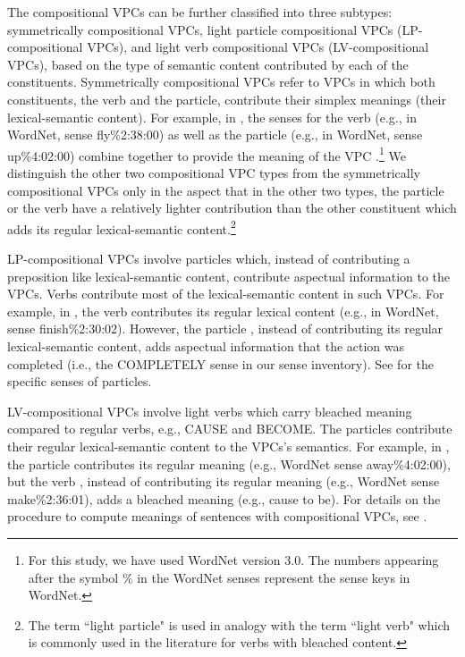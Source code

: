\documentclass[output=paper
,modfonts
,nonflat]{langsci/langscibook}
\begin{document}
The compositional VPCs can be further classified into three subtypes: symmetrically compositional VPCs, light particle compositional VPCs (LP-compositional VPCs), and light verb compositional VPCs (LV-compositional VPCs), based on the type of semantic content contributed by each of the constituents. Symmetrically compositional VPCs refer to VPCs in which both constituents, the verb and the particle, contribute their simplex meanings (their lexical-semantic content). For example, in , the senses for the verb  (e.g., in WordNet, sense fly\%2:38:00) as well as the particle  (e.g., in WordNet, sense up\%4:02:00) combine together to provide the meaning of the VPC .\footnote{For this study, we have used WordNet version 3.0. The numbers appearing after the symbol \% in the WordNet senses represent the sense keys in WordNet.} We distinguish the other two compositional VPC types from the symmetrically compositional VPCs only in the aspect that in the other two types, the particle or the verb have a relatively lighter contribution than the other constituent which adds its regular lexical-semantic content.\footnote{The term ``light particle" is used in analogy with the term ``light verb" which is commonly used in the literature for verbs with bleached content.} 

LP-compositional VPCs involve particles which, instead of contributing a preposition like lexical-semantic content, contribute aspectual information to the VPCs. Verbs contribute most of the lexical-semantic content in such VPCs. For example, in  \citep{Ban03b}, the verb  contributes its regular lexical content (e.g., in WordNet, sense finish\%2:30:02). However, the particle , instead of contributing its regular lexical-semantic content, adds aspectual information that the action was completed (i.e., the COMPLETELY sense in our sense inventory). See  for the specific senses of particles. 

LV-compositional VPCs involve light verbs which carry bleached meaning compared to regular verbs, e.g., CAUSE and BECOME. The particles contribute their regular lexical-semantic content to the VPCs's semantics.  For example, in , the particle  contributes its regular meaning (e.g., WordNet sense away\%4:02:00), but the verb , instead of contributing its regular meaning (e.g., WordNet sense make\%2:36:01), adds a bleached meaning (e.g., cause to be). For details on the procedure to compute meanings of sentences with compositional VPCs, see .
\end{document}
